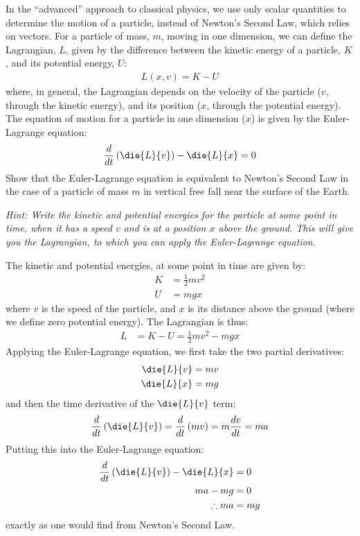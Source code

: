 \question In the ``advanced'' approach to classical physics, we use only scalar quantities to determine the motion of a particle, instead of Newton's Second Law, which relies on vectors. For a particle of mass, $m$, moving in one dimension, we can define the Lagrangian, $L$, given by the difference between the kinetic energy of a particle, $K$, and its potential energy, $U$:
\begin{align*}
L(x,v)=K-U
\end{align*}
where, in general, the Lagrangian depends on the velocity of the particle ($v$, through the kinetic energy), and its position ($x$, through the potential energy). 
The equation of motion for a particle in one dimension ($x$) is given by the Euler-Lagrange equation:
\begin{align*}
\frac{d}{dt}\left(\die{L}{v}\right)-\die{L}{x}=0
\end{align*}
Show that the Euler-Lagrange equation is equivalent to Newton's Second Law in the case of a particle of mass $m$ in vertical free fall near the surface of the Earth. 

\textit{Hint: Write the kinetic and potential energies for the particle at some point in time, when it has a speed $v$ and is at a position $x$ above the ground. This will give you the Lagrangian, to which you can apply the Euler-Lagrange equation.}

\begin{solution}
The kinetic and potential energies, at some point in time are given by:
\begin{align*}
K &=\frac{1}{2}mv^2\\
U &=mgx
\end{align*}
where $v$ is the speed of the particle, and $x$ is its distance above the ground (where we define zero potential energy). The Lagrangian is thus:
\begin{align*}
L&=K-U=\frac{1}{2}mv^2-mgx
\end{align*}
Applying the Euler-Lagrange equation, we first take the two partial derivatives:
\begin{align*}
\die{L}{v} &= mv\\
\die{L}{x} &= mg
\end{align*}
and then the time derivative of the $\die{L}{v}$ term:
\begin{align*}
\frac{d}{dt}\left(\die{L}{v}\right) =\frac{d}{dt}\left(mv\right)=m\frac{dv}{dt}=ma
\end{align*}
Putting this into the Euler-Lagrange equation:
\begin{align*}
\frac{d}{dt}\left(\die{L}{v}\right)-\die{L}{x}&=0\\
ma - mg &=0\\
\therefore ma&=mg
\end{align*}
exactly as one would find from Newton's Second Law.
\end{solution}

